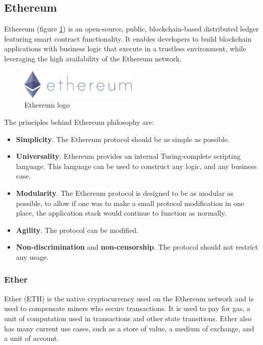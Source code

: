 \documentclass[a4paper, 12pt]{article} %
\begin{document}
    \subsection{Ethereum}
        Ethereum\cite{ethereum} (figure \ref{fig:ethereum_logo}) is an open-source, public, blockchain-based distributed ledger featuring smart contract functionality. It enables developers to build blockchain applications with business logic that execute in a trustless environment, while leveraging the high availability of the Ethereum network. 
        \begin{figure}[h]
            \centering
            \includegraphics[width=0.5\textwidth]{ethereum-logo-portrait-purple.png}
            \caption{Ethereum logo}
            \label{fig:ethereum_logo}
        \end{figure}
        The principles behind Ethereum philosophy are\cite{ethereumWhitepaper}:
        \begin{itemize}
            \item \textbf{Simplicity}. The Ethereum protocol should be as simple as possible.
            \item \textbf{Universality}. Ethereum provides an internal Turing-complete scripting language. This language can be used to construct any logic, and any business case.
            \item \textbf{Modularity}. The Ethereum protocol is designed to be as modular as possible, to allow if one was to make a small protocol modification in one place, the application stack would continue to function as normally. 
            \item \textbf{Agility}. The protocol can be modified.
            \item \textbf{Non-discrimination} and \textbf{non-censorship}. The protocol should not restrict any usage.
        \end{itemize}
        
        \subsubsection{Ether}
            Ether (ETH) is the native cryptocurrency used on the Ethereum network and is used to compensate miners who secure transactions. It is used to pay for gas, a unit of computation used in transactions and other state transitions.
            Ether also has many current use cases, such as a store of value, a medium of exchange, and a unit of account.
            
\end{document}
